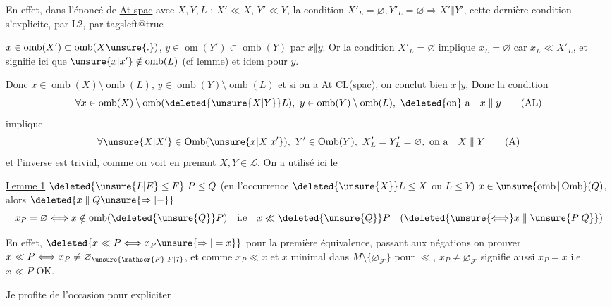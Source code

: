 En effet,  dans l'énoncé de \uline{At spac} avec $X,Y,L$ : $X'\ll X$, $Y'\ll Y$, la condition $X'_L=\varnothing,Y'_L=\varnothing\Rightarrow X'\mathrel{\Vert}Y'$, cette dernière condition s'explicite, par L2, par
\begingroup\csname tagsleft@true\endcsname

 $x\in\operatorname{omb}(X')\subset\operatorname{omb}(X\unsure{.})$, $y\in\operatorname{om}(Y')\subset\operatorname{omb}(Y)$ par $x\mathrel{\Vert}y$. Or la condition $X'_L=\varnothing$ implique $x_L=\varnothing$ car $x_L\ll X'_L$, et  signifie  ici que $\unsure{x|x'}\notin\operatorname{omb}(L)$ (cf lemme) et idem pour $y$.

Donc $x\in\operatorname{omb}(X)\setminus\operatorname{omb}(L)$, $y\in\operatorname{omb}(Y)\setminus\operatorname{omb}(L)$ et si on a At CL(spac), on conclut bien $x\mathrel{\Vert}y$,  Donc la condition
\[
 \forall x\in\operatorname{omb}(X)\setminus\operatorname{omb}(\deleted{\unsure{X|Y}}L),\
 y\in\operatorname{omb}(Y)\setminus\operatorname{omb}(L),\
 \text{\deleted{on} a}\quad x\mathrel{\Vert}y
 \tag*{(AL)}
\]
implique
\[
 \forall \unsure{X|X'}\in\operatorname{Omb}(\unsure{x|X|x'}),\
 Y'\in\operatorname{Omb}(Y),\ X'_L=Y'_L=\varnothing,\ \text{on a}\quad X\mathrel{\Vert}Y
 \tag*{(A)}
\]
et l'inverse est trivial, comme on voit en prenant $X,Y\in\mathcal{L}$. On a utilisé ici le

\uline{Lemme 1}  $\deleted{\unsure{L|E}\leq F}\ P\leq Q$ (en l'occurrence $\deleted{\unsure{X}}L\leq X$ ou $L\leq Y$) $x\in\unsure{\operatorname{omb}|\operatorname{Omb}}(Q)$, alors $\deleted{x\mathrel{\Vert}Q\unsure{\Rightarrow|-}}$
\[
 x_P=\varnothing\Longleftrightarrow x\notin\operatorname{omb}(\deleted{\unsure{Q}}P)\quad
 \text{i.e}\quad x\not\ll\deleted{\unsure{Q}}P\quad
 (\deleted{\unsure{\Longleftrightarrow}x\mathrel{\Vert}\unsure{P|Q}})
\]

En effet, $\deleted{x\ll P\Longleftrightarrow x_P\unsure{\Rightarrow|=x}}$ pour la première équivalence, passant aux négations on  prouver $x\ll P\Longleftrightarrow x_P\ne\varnothing_{\unsure{\mathscr{F}|F|7}}$, et comme $x_P\ll x$ et $x$ minimal dans $M\setminus\{\varnothing_{\mathscr{F}}\}$ pour $\ll$, $x_P\ne\varnothing_{\mathscr{F}}$ signifie aussi $x_P=x$ i.e. $x\ll P$ OK.

 Je profite de l'occasion pour expliciter

